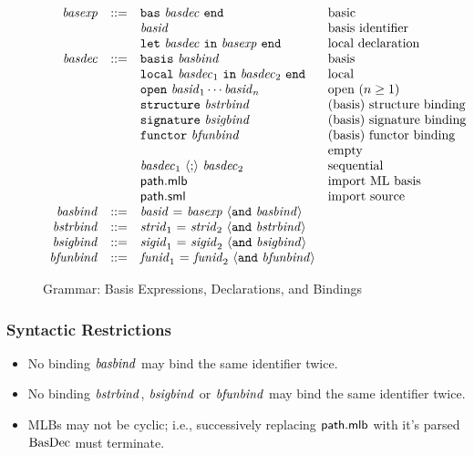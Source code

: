 \begin{figure}[h]
\begin{displaymath}
\begin{array}{rcll}
\mit{basexp} & ::= & 
\mtt{bas}~ \mit{basdec} ~\mtt{end} 
& \mbox{basic} \\&& 
\mit{basid} 
& \mbox{basis identifier} \\&&
\mtt{let}~ \mit{basdec} ~\mtt{in}~ \mit{basexp} ~\mtt{end} 
& \mbox{local declaration} \\

\mit{basdec} & ::= & 
\mtt{basis}~ \mit{basbind}
& \mbox{basis} \\&&
\mtt{local}~ \mit{basdec}_1 ~\mtt{in}~ \mit{basdec}_2 ~\mtt{end} 
& \mbox{local} \\&&
\mtt{open}~ \mit{basid}_1 \cdots \mit{basid}_n 
& \mbox{open ($n \geq 1$)} \\&&
\mtt{structure}~ \mit{bstrbind}
& \mbox{(basis) structure binding} \\&&
\mtt{signature}~ \mit{bsigbind}
& \mbox{(basis) signature binding} \\&&
\mtt{functor}~ \mit{bfunbind}
& \mbox{(basis) functor binding} \\&&
\quad
& \mbox{empty} \\&&
\mit{basdec}_1~\langle\mtt{;}\rangle~\mit{basdec}_2 
& \mbox{sequential} \\&&
\msf{path.mlb} &
\mbox{import ML basis} \\&&
\msf{path.sml} 
& \mbox{import source} \\

\mit{basbind} & ::= &  
\mit{basid} ~\mtt{=}~ \mit{basexp} ~\langle\mtt{and}~ \mit{basbind}\rangle \\
\mit{bstrbind} & ::= &  
\mit{strid}_1 ~\mtt{=}~ \mit{strid}_2 ~\langle\mtt{and}~ \mit{bstrbind}\rangle \\
\mit{bsigbind} & ::= &  
\mit{sigid}_1 ~\mtt{=}~ \mit{sigid}_2 ~\langle\mtt{and}~ \mit{bsigbind}\rangle \\
\mit{bfunbind} & ::= &  
\mit{funid}_1 ~\mtt{=}~ \mit{funid}_2 ~\langle\mtt{and}~ \mit{bfunbind}\rangle
\end{array}
\end{displaymath}
\caption{Grammar: Basis Expressions, Declarations, and Bindings}\label{fig:mlb:S:GrammaticalRules}
\end{figure}
%
\subsubsection{Syntactic Restrictions}
\begin{itemize}
\item No binding $\mit{basbind}$ may bind the same identifier twice.
\item No binding $\mit{bstrbind}$, $\mit{bsigbind}$ or $\mit{bfunbind}$ may bind the same identifier twice.
\item MLBs may not be cyclic; i.e., successively replacing
  $\msf{path.mlb}$ with it's parsed $\mrm{BasDec}$ must terminate.
\end{itemize}
%
